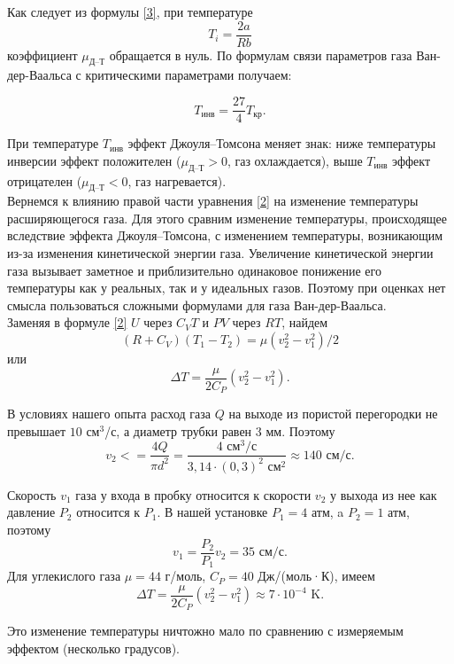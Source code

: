 \documentclass[a4paper, 12pt]{article}
\begin{document}
    \noindent Как следует из формулы \eqref{3}, при температуре \[ T_i = \frac{2a}{Rb} \] коэффициент $\mu_\text{Д--Т}$ обращается в нуль. По формулам связи параметров газа Ван-дер-Ваальса с критическими параметрами получаем: 

    \begin{equation}
        \label{4}
        T_\text{инв} = \frac{27}{4} T_\text{кр}.
    \end{equation}

    \noindent При температуре $T_\text{инв}$ эффект Джоуля–Томсона меняет знак: ниже температуры инверсии эффект положителен ($\mu_\text{Д--Т} > 0$, газ охлаждается), выше $T_\text{инв}$ эффект отрицателен ($\mu_\text{Д--Т} < 0$, газ нагревается).\\

    \noindent Вернемся к влиянию правой части уравнения \eqref{2} на изменение температуры расширяющегося газа. Для этого сравним изменение температуры, происходящее вследствие эффекта Джоуля–Томсона, с изменением температуры, возникающим из-за изменения кинетической энергии газа. Увеличение кинетической энергии газа вызывает заметное и приблизительно одинаковое понижение его температуры как у реальных, так и у идеальных газов. Поэтому при оценках нет смысла пользоваться сложными формулами для газа Ван-дер-Ваальса.\\

    \noindent Заменяя в формуле \eqref{2} $U$ через $C_VT$ и $PV$ через $RT$, найдем \[ \left(R+C_V\right)\left(T_1-T_2\right)=\mu\left(v_2^2-v_1^2\right)/2 \] или \[ \Delta T = \frac{\mu}{2C_P}\left(v_2^2-v_1^2\right). \]
    
    \noindent В условиях нашего опыта расход газа $Q$ на выходе из пористой перегородки не превышает $10 $ см$ ^3 $/с, а диаметр трубки равен 3 мм. Поэтому \[ v_2<=\frac{4Q}{\pi d^2} = \frac{4 \text{ см}^3/\text{с}}{3,14\cdot(0,3)^2\text{ см}^2} \approx 140 \text{ см}/\text{с}. \]

    \noindent Скорость $v_1$ газа у входа в пробку относится к скорости $v_2$ у выхода из нее как давление $P_2$ относится к $P_1$. В нашей установке $P_1 = 4$ атм, a $P_2 = 1$ атм, поэтому \[ v_1=\frac{P_2}{P_1}v_2 = 35 \text{ см}/\text{с}. \]Для углекислого газа $ \mu = 44 $ г/моль, $ C_P = 40 $ Дж/(моль·К), имеем \[ \Delta T = \frac{\mu}{2C_P}\left(v_2^2-v_1^2\right) \approx 7\cdot10^{-4} \text{ K}. \]

    \noindent Это изменение температуры ничтожно мало по сравнению с измеряемым эффектом (несколько градусов).\\
\end{document}

